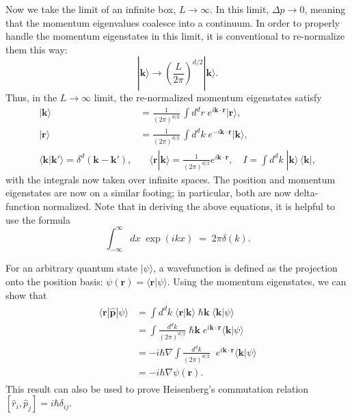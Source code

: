 \documentclass[pra,12pt]{revtex4}
\begin{document}
Now we take the limit of an infinite box, $L \rightarrow \infty$.  In
this limit, $\Delta p \rightarrow 0$, meaning that the momentum
eigenvalues coalesce into a continuum.  In order to properly handle
the momentum eigenstates in this limit, it is conventional to
re-normalize them this way:
\begin{equation}
  |\mathbf{k}\rangle \rightarrow \left(\frac{L}{2\pi}\right)^{d/2} |\mathbf{k}\rangle.
\end{equation}
Thus, in the $L\rightarrow\infty$ limit, the re-normalized momentum
eigenstates satisfy
$$\boxed{\begin{aligned} |\mathbf{k}\rangle &= \frac{1}{(2\pi)^{d/2}} \, \int d^dr \; e^{i\mathbf{k}\cdot\mathbf{r}} |\mathbf{r}\rangle, \\ |\mathbf{r}\rangle &= \frac{1}{(2\pi)^{d/2}} \, \int d^dk \; e^{-i\mathbf{k}\cdot\mathbf{r}} |\mathbf{k}\rangle, \\\langle\mathbf{k}|\mathbf{k}'\rangle = \delta^d(\mathbf{k}-\mathbf{k}'),& \quad \langle\mathbf{r}|\mathbf{k}\rangle = \frac{1}{(2\pi)^{d/2}} e^{i\mathbf{k}\cdot\mathbf{r}}, \quad I = \int d^dk \;|\mathbf{k}\rangle\,\langle\mathbf{k}|,\end{aligned}}$$
with the integrals now taken over infinite spaces.  The position and
momentum eigenstates are now on a similar footing; in particular, both
are now delta-function normalized.  Note that in deriving the above
equations, it is helpful to use the formula
\begin{equation}
  \int_{-\infty}^\infty dx\; \exp(ikx) \;=\; 2\pi\delta(k).
\end{equation}

For an arbitrary quantum state $|\psi\rangle$, a wavefunction is
defined as the projection onto the position basis: $\psi(\mathbf{r}) =
\langle \mathbf{r}|\psi\rangle$.  Using the momentum eigenstates, we can
show that
\begin{align}
  \begin{aligned}\langle \mathbf{r}|\hat{\mathbf{p}}|\psi\rangle &=  \int d^dk \; \langle\mathbf{r}|\mathbf{k}\rangle \; \hbar\mathbf{k} \; \langle\mathbf{k}|\psi\rangle \\ &=  \int \frac{d^dk}{(2\pi)^{d/2}}\; \hbar\mathbf{k} \;e^{i\mathbf{k}\cdot\mathbf{r}} \langle\mathbf{k}|\psi\rangle \\ &=  -i\hbar\nabla \int \frac{d^dk}{(2\pi)^{d/2}}\; \;e^{i\mathbf{k}\cdot\mathbf{r}} \langle\mathbf{k}|\psi\rangle \\ &= -i\hbar \nabla\psi(\mathbf{r}).\end{aligned}
\end{align}
This result can also be used to prove Heisenberg's commutation relation
$[\hat{r}_i, \hat{p}_j] = i\hbar\delta_{ij}$.
\end{document}

